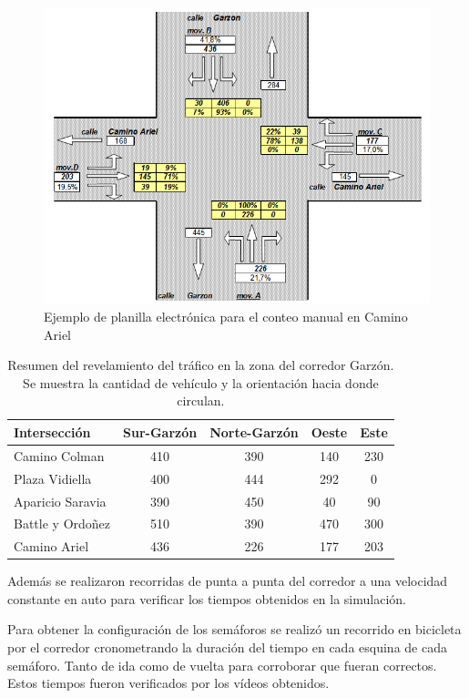 \begin{figure}[H]
	\centering
	\includegraphics[width=0.9\linewidth]{Figures/conteo_hoja}
	\caption{Ejemplo de planilla electrónica para el conteo manual en Camino Ariel}
	\label{fig:conteo_hoja}
\end{figure}



\begin{table}[h]
	\renewcommand{\arraystretch}{1.2}
	\caption{Resumen del revelamiento del tráfico en la zona del corredor Garzón. Se muestra la cantidad de vehículo y la orientación hacia donde circulan.}
	\label{table:resumen_trafico}
	\centering
	\begin{tabular}{lcccc}
		\hline
		Intersección&
		Sur-Garzón& 
		Norte-Garzón & 
		Oeste &
		Este 
		\\ 
		\hline
		Camino Colman  & 410 & 390 & 140 & 230\\		
		Plaza Vidiella  & 400 & 444 & 292 & 0\\		
		Aparicio Saravia  & 390 & 450 & 40 & 90\\		
		Battle y Ordoñez  & 510 & 390 & 470 & 300 \\	
		Camino Ariel  & 436 & 226 & 177 & 203 \\													
		\hline
		
		
		\hline
	\end{tabular}
\end{table}


Además se realizaron recorridas de punta a punta del corredor a una velocidad constante en auto para verificar los tiempos obtenidos en la simulación.

Para obtener la configuración de los semáforos se realizó un recorrido en bicicleta por el corredor cronometrando la duración del tiempo en cada esquina de cada semáforo. Tanto de ida como de vuelta para corroborar que fueran correctos. Estos tiempos fueron verificados por los vídeos obtenidos.


